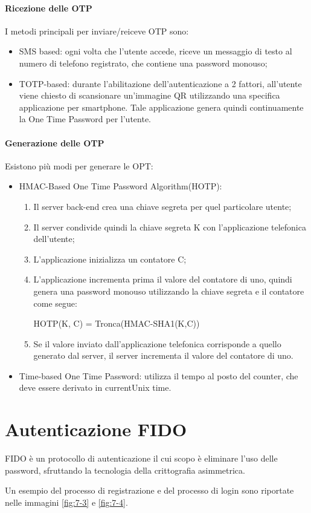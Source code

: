 \paragraph{Ricezione delle OTP} I metodi principali per inviare/reiceve OTP sono:
\begin{itemize}
    \item SMS based: ogni volta che l'utente accede, riceve un messaggio di testo al numero di telefono registrato, che contiene una password monouso;
    \item TOTP-based: durante l'abilitazione dell'autenticazione a 2 fattori, all'utente viene chiesto di scansionare un'immagine QR utilizzando una specifica applicazione per smartphone. Tale applicazione genera quindi continuamente la One Time Password per l'utente.
\end{itemize}

\paragraph{Generazione delle OTP} Esistono più modi per generare le OPT:
\begin{itemize}
    \item HMAC-Based One Time Password Algorithm(HOTP): 
    \begin{enumerate}
        \item Il server back-end crea una chiave segreta per quel particolare utente;
        \item Il server condivide quindi la chiave segreta K con l'applicazione telefonica dell'utente;
        \item L'applicazione inizializza un contatore C;
        \item L'applicazione incrementa prima il valore del contatore di uno, quindi genera una password monouso utilizzando la chiave segreta e il contatore come segue:
        \begin{center}
            HOTP(K, C) = Tronca(HMAC-SHA1(K,C))
        \end{center}
        \item Se il valore inviato dall'applicazione telefonica corrisponde a quello generato dal server, il server incrementa il valore del contatore di uno.
    \end{enumerate}
    \item Time-based One Time Password: utilizza il tempo al posto del counter, che deve essere derivato in currentUnix time.
\end{itemize}

\section{Autenticazione FIDO}
FIDO è un protocollo di autenticazione il cui scopo è eliminare l'uso delle password, sfruttando la tecnologia della crittografia asimmetrica.

Un esempio del processo di registrazione e del processo di login sono riportate nelle immagini \ref{fig:7-3} e \ref{fig:7-4}.

